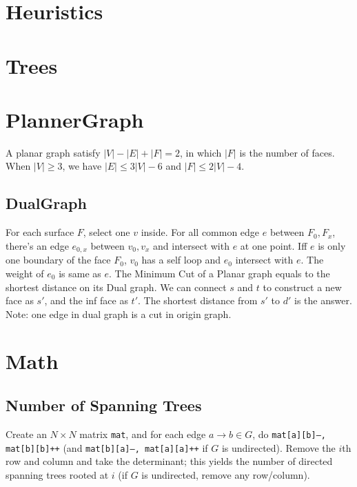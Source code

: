\section{Heuristics}

\section{Trees}

\section{PlannerGraph}
A planar graph satisfy $|V| - |E| + |F| = 2$, in which $|F|$ is the number of faces. 
When $|V| \geq 3$, we have $|E| \leq 3|V|-6$ and $|F|\leq 2|V|-4$. \\

\subsection{DualGraph}
For each surface $F$, select one $v$ inside. 
For all common edge $e$ between $F_0, F_x$, there's an edge $e_{0,x}$ between $v_0, v_x$ and intersect with $e$ at one point. 
Iff $e$ is only one boundary of the face $F_0$, $v_0$ has a self loop and $e_0$ intersect with $e$.  
The weight of $e_0$ is same as $e$.
The Minimum Cut of a Planar graph equals to the shortest distance on its Dual graph.
We can connect $s$ and $t$ to construct a new face as $s'$, and the inf face as $t'$. 
The shortest distance from $s'$ to $d'$ is the answer. 
Note: one edge in dual graph is a cut in origin graph.

\section{Math}
	\subsection{Number of Spanning Trees}
		Create an $N\times N$ matrix \texttt{mat}, and for each edge $a \rightarrow b \in G$, do
		\texttt{mat[a][b]--, mat[b][b]++} (and \texttt{mat[b][a]--, mat[a][a]++} if $G$ is undirected).
		Remove the $i$th row and column and take the determinant; this yields the number of directed spanning trees rooted at $i$
		(if $G$ is undirected, remove any row/column).

